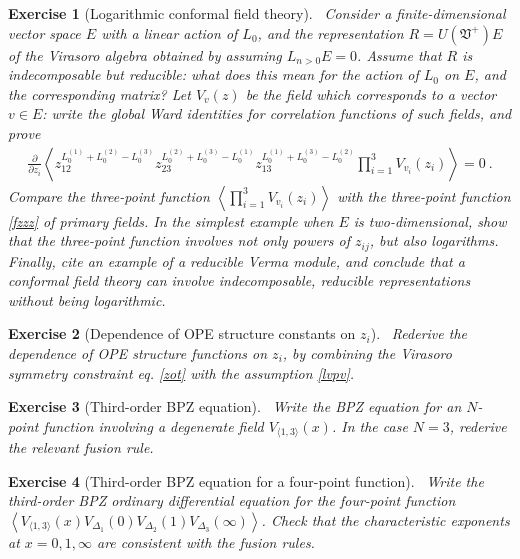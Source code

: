 \documentclass[12pt, a4paper, notitlepage, twoside]{report}
\numberwithin{equation}{section}
\theoremstyle{break}
\newtheorem{exo}{Exercise}[chapter]
\begin{document}
\begin{exo}[Logarithmic conformal field theory]
 ~\label{exolog}
Consider a finite-dimensional vector space $E$ with a linear action of $L_0$, and the representation $R=U(\mathfrak{V}^+)E$ of the Virasoro algebra obtained by assuming $L_{n>0}E=0$.
Assume that $R$ is indecomposable but reducible: what does this mean for the action of $L_0$ on $E$, and the corresponding matrix? Let $V_v(z)$ be the field which corresponds to a vector $v\in E$: write the global Ward identities for correlation functions of such fields, and prove 
\begin{align}
 {\frac{\partial}{\partial z_i}} \left\langle z_{12}^{L_0^{(1)}+L_0^{(2)}-L_0^{(3)}} z_{23}^{L_0^{(2)}+L_0^{(3)}-L_0^{(1)}} z_{13}^{L_0^{(1)}+L_0^{(3)}-L_0^{(2)}} \prod_{i=1}^3 V_{v_i}(z_i)\right\rangle = 0\ .
\end{align}
Compare the three-point function $\left\langle  \prod_{i=1}^3 V_{v_i}(z_i)\right\rangle$ with the three-point function \eqref{fzzz} of primary fields.
In the simplest example when $E$ is two-dimensional, show that the three-point function involves not only powers of $z_{ij}$, but also logarithms.
Finally, cite an example of a reducible Verma module, and conclude that 
a conformal field theory can involve indecomposable, reducible representations without being logarithmic. 
\end{exo}


\begin{exo}[Dependence of OPE structure constants on $z_i$]
 ~\label{exoopz}
Rederive the dependence of OPE structure functions on $z_i$, by combining the Virasoro symmetry constraint eq. \eqref{zot} with the assumption \eqref{lvpv}.  
\end{exo}

\begin{exo}[Third-order BPZ equation]
 ~\label{exotob}
 Write the BPZ equation for an $N$-point function involving a degenerate field $V_{\langle 1,3 \rangle}(x)$.
In the case $N=3$, rederive the relevant fusion rule.
\end{exo}

\begin{exo}[Third-order BPZ equation for a four-point function]
 ~\label{exotbf}
 Write the third-order BPZ ordinary differential equation for the four-point function $\left\langle V_{\langle 1,3 \rangle}(x)V_{\Delta_1}(0)V_{\Delta_2}(1)V_{\Delta_3}(\infty)\right\rangle $.
Check that the characteristic exponents at $x=0,1,\infty$ are consistent with the fusion rules. 
\end{exo}
\end{document}
